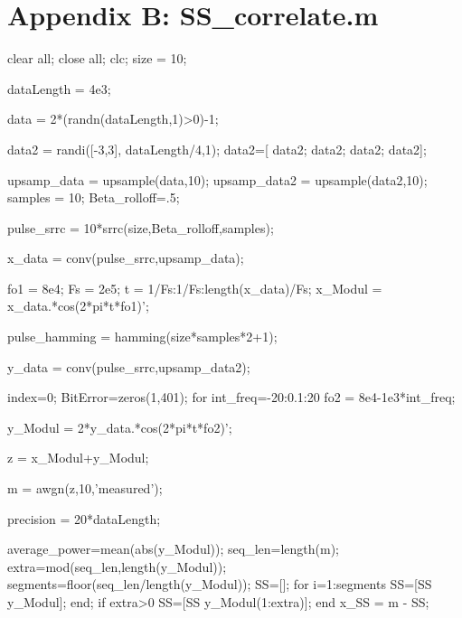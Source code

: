 \chapter{Appendix B: SS_correlate.m}

clear all; close all; clc;
size = 10;

dataLength = 4e3;

data = 2*(randn(dataLength,1)>0)-1;


data2 = randi([-3,3], dataLength/4,1);
data2=[ data2; data2; data2; data2];

upsamp_data = upsample(data,10);
upsamp_data2 = upsample(data2,10);
samples = 10;   %
Beta_rolloff=.5;    %

pulse_srrc = 10*srrc(size,Beta_rolloff,samples);

x_data = conv(pulse_srrc,upsamp_data);

fo1 = 8e4;
Fs = 2e5;
t = 1/Fs:1/Fs:length(x_data)/Fs;
x_Modul = x_data.*cos(2*pi*t*fo1)';

pulse_hamming = hamming(size*samples*2+1);

y_data = conv(pulse_srrc,upsamp_data2);

index=0;
BitError=zeros(1,401);
for int_freq=-20:0.1:20
fo2 = 8e4-1e3*int_freq;

y_Modul = 2*y_data.*cos(2*pi*t*fo2)';

z = x_Modul+y_Modul;

m = awgn(z,10,'measured');


precision = 20*dataLength;

average_power=mean(abs(y_Modul));
seq_len=length(m);
extra=mod(seq_len,length(y_Modul));
segments=floor(seq_len/length(y_Modul));
SS=[];
for i=1:segments SS=[SS y_Modul]; end;
if extra>0
SS=[SS y_Modul(1:extra)];
end
x_SS = m - SS;


